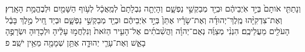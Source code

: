 \documentclass{openreader}
\begin{document}
וְנָתַתִּ֤י אֹותָם֙ בְּיַ֣ד אֹֽיְבֵיהֶ֔ם וּבְיַ֖ד מְבַקְשֵׁ֣י נַפְשָׁ֑ם וְהָיְתָ֤ה נִבְלָתָם֙ לְמַֽאֲכָ֔ל לְעֹ֥וף הַשָּׁמַ֖יִם וּלְבֶהֱמַ֥ת הָאָֽרֶץ׃ 
וְאֶת־צִדְקִיָּ֨הוּ מֶֽלֶךְ־יְהוּדָ֜ה וְאֶת־שָׂרָ֗יו אֶתֵּן֙ בְּיַ֣ד אֹֽיְבֵיהֶ֔ם וּבְיַ֖ד מְבַקְשֵׁ֣י נַפְשָׁ֑ם וּבְיַד חֵ֚יל מֶ֣לֶךְ בָּבֶ֔ל הָעֹלִ֖ים מֵעֲלֵיכֶֽם׃ 
הִנְנִ֨י מְצַוֶּ֜ה נְאֻם־יְהוָ֗ה וַהֲשִׁ֨בֹתִ֜ים אֶל־הָעִ֤יר הַזֹּאת֙ וְנִלְחֲמ֣וּ עָלֶ֔יהָ וּלְכָד֖וּהָ וּשְׂרָפֻ֣הָ בָאֵ֑שׁ וְאֶת־עָרֵ֧י יְהוּדָ֛ה אֶתֵּ֥ן שְׁמָמָ֖ה מֵאֵ֥ין יֹשֵֽׁב׃ פ 
\end{document}
